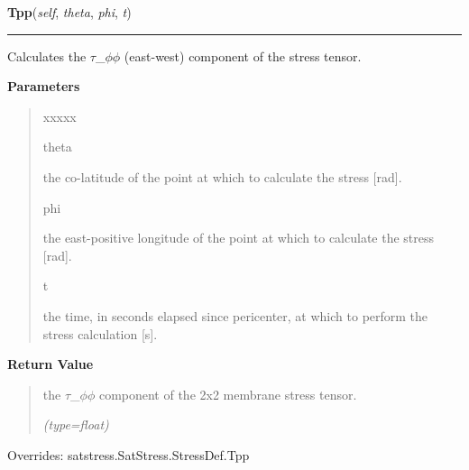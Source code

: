     \vspace{0.5ex}

\hspace{.8\funcindent}\begin{boxedminipage}{\funcwidth}

    \raggedright \textbf{Tpp}(\textit{self}, \textit{theta}, \textit{phi}, \textit{t})

    \vspace{-1.5ex}

    \rule{\textwidth}{0.5\fboxrule}
\setlength{\parskip}{2ex}
    Calculates the \(\tau\)\_\(\phi\)\(\phi\) (east-west) component of the 
    stress tensor.

\setlength{\parskip}{1ex}
      \textbf{Parameters}
      \vspace{-1ex}

      \begin{quote}
        \begin{Ventry}{xxxxx}

          \item[theta]

          the co-latitude of the point at which to calculate the stress 
          [rad].

          \item[phi]

          the east-positive longitude of the point at which to calculate 
          the stress [rad].

          \item[t]

          the time, in seconds elapsed since pericenter, at which to 
          perform the stress calculation [s].

        \end{Ventry}

      \end{quote}

      \textbf{Return Value}
    \vspace{-1ex}

      \begin{quote}
      the \(\tau\)\_\(\phi\)\(\phi\) component of the 2x2 membrane stress 
      tensor.

      {\it (type=float)}

      \end{quote}

      Overrides: satstress.SatStress.StressDef.Tpp

    \end{boxedminipage}

